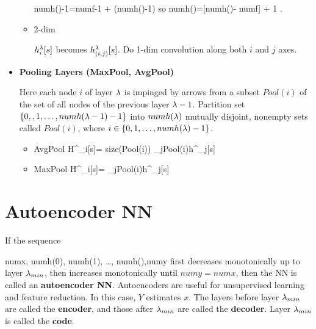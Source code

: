 \begin{itemize}
\begin{itemize}
\beq
numh()-1=numf-1 +
(numh(\lam)-1)\sigma
\;
\eeq
so
\beq
numh(\lam)=[numh()-
numf] + 1
\;.
\eeq
\item 2-dim

$h_i^\lambda[s]$ becomes
$h_{(i,j)}^\lambda[s]$.
Do 1-dim convolution
along both $i$ and $j$ axes.

\end{itemize}
\item{\bf Pooling Layers 
(MaxPool, AvgPool)}

Here each node $i$ 
of layer $\lambda$ is impinged by
arrows from  a subset $Pool(i)$
of the set of all
nodes of the previous layer $\lambda-1$.
Partition set
$\{0,,1,\dots,numh(\lambda-1)-1\}
$ into $numh(\lambda)$ mutually
disjoint, nonempty sets
called $Pool(i)$, where
$i\in \{0, 1, \ldots,numh(\lambda)-1\}$.

\begin{itemize}
\item AvgPool
\beq
H^\lam_i[s]=
{size(Pool(i))}
\sum_{j\in Pool(i)}h^{}_j[s]
\eeq
\item MaxPool
\beq
H^\lam_i[s]=
\max_{j\in Pool(i)}h^{}_j[s]
\eeq

\end{itemize}


\end{itemize}

\section*{Autoencoder NN}


If the sequence 

\beq
numx, numh(0), numh(1), \ldots,
numh(),numy
\eeq
first decreases monotonically 
up to layer $\lambda_{min}$, then
increases monotonically until
$numy=numx$, then
the NN is called an {\bf
autoencoder NN}.
Autoencoders
are  useful for unsupervised learning
and
feature reduction. In this case,
$Y$ estimates $x$.
The layers before
layer $\lambda_{min}$
are called the {\bf encoder},
and those after 
$\lambda_{min}$ are called the 
{\bf decoder}.
Layer $\lambda_{min}$
is called the {\bf code}.



